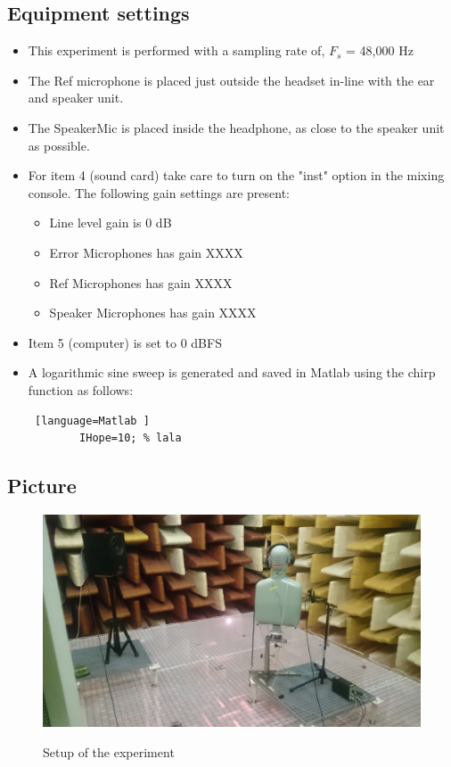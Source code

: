 \subsection{Equipment settings}
\begin{itemize}
	\item This experiment is performed with a sampling rate of, $F_{s}$ = 48,000 Hz
	\item The Ref microphone is placed just outside the headset in-line with the ear and speaker unit. 
	\item The SpeakerMic is placed inside the headphone, as close to the speaker unit as possible. 
	\item For item 4 (sound card) take care to turn on the "inst" option in the mixing console. The following gain settings are present: 		
	\begin{itemize}
		\item Line level gain is 0 dB
		\item Error Microphones has gain XXXX
		\item Ref Microphones has gain XXXX
		\item Speaker Microphones has gain XXXX
	\end{itemize}
	\item Item 5 (computer) is set to 0 dBFS
	\item A logarithmic sine sweep is generated and saved in Matlab using the chirp function as follows:
	\begin{lstlisting} [language=Matlab	]
		IHope=10; % lala
	\end{lstlisting}
\end{itemize}

\subsection{Picture}
\begin{figure}[H]
	\includegraphics[width=\textwidth]{../Journal/Experiments/AngleOfIncidence/AngInSetup.jpg}
	\label{AngIncidenceSetup}	
	\caption{Setup of the experiment}
\end{figure}


